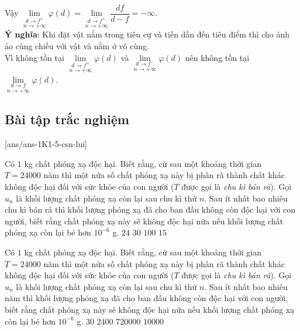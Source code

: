 \begin{bt}
{\begin{listEX}
			Vậy $\underset{d \rightarrow f^{+}}\lim \limits_{n \to +\infty}\varphi(d)=\underset{d \rightarrow f^{+}}\lim \limits_{n \to +\infty} \dfrac{d f}{d-f}=-\infty$.\\
			\textbf{Ý nghĩa}: Khi đặt vật nằm trong tiêu cự và tiến dần đến tiêu điểm thì cho ảnh ảo cùng chiều với vật và nằm ở vô cùng.\\
			Vì không tồn tại $\underset{d \rightarrow f^{+}}\lim \limits_{n \to +\infty}\varphi(d)$ và $\underset{d \rightarrow f^{-}}\lim \limits_{n \to +\infty}\varphi(d)$ nên không tồn tại $\underset{d \rightarrow f}\lim \limits_{n \to +\infty}\varphi(d)$.
		\end{listEX}
	}
\end{bt}
\subsection*{Bài tập trắc nghiệm}
[ans/ans-1K1-5-csn-lui]
\begin{ex}%
	Có $1$ kg chất phóng xạ độc hại. Biết rằng, cứ sau một khoảng thời gian $T=24000$ năm thì một nửa số chất phóng xạ này bị phân rã thành chất khác không độc hại đối với sức khỏe của con người ($T$ được gọi là \textit{chu kì bán rã}). Gọi $u_n$ là khối lượng chất phóng xạ còn lại sau chu kì thứ $n$.
	Sau ít nhất bao nhiêu chu kì bán rã thì khối lượng phóng xạ đã cho ban đầu không còn độc hại với con người, biết rằng chất phóng xạ này sẽ không độc hại nữa nếu khối lượng chất phóng xạ còn lại bé hơn $10^{-6}$ g.
	\choice
	{$24$}
	{\True $30$}
	{$100$}
	{$15$}
\end{ex}
\begin{ex}%
	Có $1$ kg chất phóng xạ độc hại. Biết rằng, cứ sau một khoảng thời gian $T=24000$ năm thì một nửa số chất phóng xạ này bị phân rã thành chất khác không độc hại đối với sức khỏe của con người ($T$ được gọi là \textit{chu kì bán rã}). Gọi $u_n$ là khối lượng chất phóng xạ còn lại sau chu kì thứ $n$.
	Sau ít nhất bao nhiêu năm thì khối lượng phóng xạ đã cho ban đầu không còn độc hại với con người, biết rằng chất phóng xạ này sẽ không độc hại nữa nếu khối lượng chất phóng xạ còn lại bé hơn $10^{-6}$ g.
	\choice
	{$30$}
	{$2400$}
	{\True $720000$}
	{$10000$}
\end{ex}
